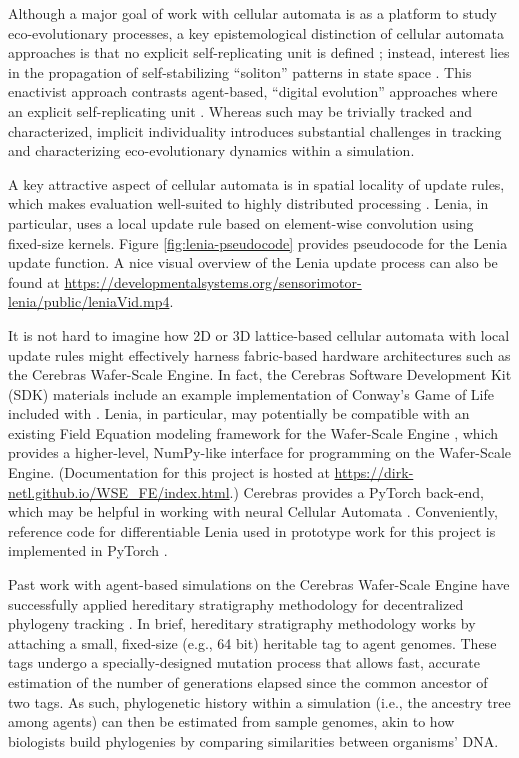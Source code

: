 Although a major goal of work with cellular automata is as a platform to study eco-evolutionary processes, a key epistemological distinction of cellular automata approaches is that no explicit self-replicating unit is defined \citep{hamon2022learning}; instead, interest lies in the propagation of self-stabilizing ``soliton'' patterns in state space \citep{chan2019lenia}.
This enactivist approach contrasts agent-based, ``digital evolution'' approaches where an explicit self-replicating unit \citep{pennock2007models}.
Whereas such may be trivially tracked and characterized, implicit individuality introduces substantial challenges in tracking and characterizing eco-evolutionary dynamics within a simulation.

A key attractive aspect of cellular automata is in spatial locality of update rules, which makes evaluation well-suited to highly distributed processing \citep{ackley2023robust}.
Lenia, in particular, uses a local update rule based on element-wise convolution using fixed-size kernels.
Figure \ref{fig:lenia-pseudocode} provides pseudocode for the Lenia update function.
A nice visual overview of the Lenia update process can also be found at \url{https://developmentalsystems.org/sensorimotor-lenia/public/leniaVid.mp4}.

It is not hard to imagine how 2D or 3D lattice-based cellular automata with local update rules might effectively harness fabric-based hardware architectures such as the Cerebras Wafer-Scale Engine.
In fact, the Cerebras Software Development Kit (SDK) materials include an example implementation of Conway's Game of Life included with \citep{cerebras2024gol}.
Lenia, in particular, may potentially be compatible with an existing Field Equation modeling framework for the Wafer-Scale Engine \citep{woo2022disruptive}, which provides a higher-level, NumPy-like interface for programming on the Wafer-Scale Engine.
(Documentation for this project is hosted at \url{https://dirk-netl.github.io/WSE_FE/index.html}.)
Cerebras provides a PyTorch back-end, which may be helpful in working with neural Cellular Automata \citep{cerebras2022pytorch}.
Conveniently, reference code for differentiable Lenia used in prototype work for this project is implemented in PyTorch \citep{hamon2022learning}.

Past work with agent-based simulations on the Cerebras Wafer-Scale Engine have successfully applied hereditary stratigraphy methodology for decentralized phylogeny tracking \citep{moreno2024trackable}.
In brief, hereditary stratigraphy methodology works by attaching a small, fixed-size (e.g., 64 bit) heritable tag to agent genomes.
These tags undergo a specially-designed mutation process that allows fast, accurate estimation of the number of generations elapsed since the common ancestor of two tags.
As such, phylogenetic history within a simulation  (i.e., the ancestry tree among agents) can then be estimated from sample genomes, akin to how biologists build phylogenies by comparing similarities between organisms' DNA.

